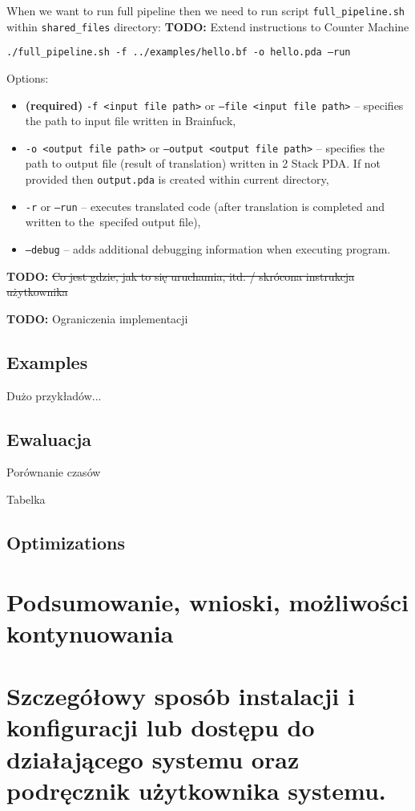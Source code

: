 \documentclass[english,shortabstract,mgr]{iithesis}
\newcommand{\todo}[1]{\textbf{TODO:} #1}
\begin{document}
When we want to run full pipeline then we need to run script \texttt{full\_pipeline.sh} within
\texttt{shared\_files} directory: \todo{Extend instructions to Counter Machine}

\texttt{./full\_pipeline.sh -f ../examples/hello.bf -o hello.pda --run}

Options:
\begin{itemize}
  \item\textbf{(required)} \texttt{-f <input file path>} or \texttt{--file <input file path>} -- specifies
      the path to input file written in Brainfuck,
  \item \texttt{-o <output file path>} or \texttt{--output <output file path>} -- specifies
      the path to output file (result of translation) written in 2 Stack PDA. If not
      provided then \texttt{output.pda} is created within current directory,
  \item \texttt{-r} or \texttt{--run} -- executes translated code (after translation is completed
      and written to the~specifed output file),
  \item \texttt{--debug} -- adds additional debugging information when executing program.
\end{itemize}


\todo{\sout{Co jest gdzie, jak to się uruchamia, itd. / skrócona instrukcja użytkownika}}

\todo{Ograniczenia implementacji}

\section{Examples}

Dużo przykładów...

\section{Ewaluacja}

Porównanie czasów

Tabelka


\section{Optimizations}

\chapter{Podsumowanie, wnioski, możliwości kontynuowania}


{}

\appendix

\chapter{Szczegółowy sposób instalacji i konfiguracji lub dostępu do działającego systemu oraz podręcznik użytkownika systemu.}

\end{document}
